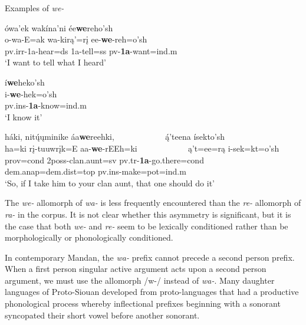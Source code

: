 \begin{exe}

\item\label{WEexamples} Examples of \textit{we-}

	\begin{xlist}
	
	\item \glll ówa'ek wakína'ni ée\textbf{we}reho'sh\\
	o-wa-E=ak wa-kirą'=rį ee-\textbf{we}-reh=o'sh\\
	pv.irr-1a-\textnormal{hear}=ds 1a-\textnormal{tell}=ss pv-\textbf{1a}-\textnormal{want}=ind.m\\
	\glt `I want to tell what I heard' \citep[47]{hollow1973a}
	
	\item \glll í\textbf{we}heko'sh\\
	i-\textbf{we}-hek=o'sh\\
	pv.ins-\textbf{1a}-\textnormal{know}=ind.m\\
	\glt `I know it' \citep[5]{kennard1936}
	
	\item \glll háki, nitų́ųminike áa\textbf{we}reehki, ~ ~ ~ ~ ~ ~ ~ ą́'teena ísekto'sh\\
	ha=ki rį-tuuwrįk=E aa-\textbf{we}-rEEh=ki ~ ~ ~ ~ ~ ~ ~ ą't=ee=rą i-sek=kt=o'sh\\
	prov=cond 2poss-\textnormal{clan.aunt}=sv pv.tr-\textbf{1a}-\textnormal{go.there}=cond ~ ~ ~ ~ ~ ~ ~ dem.anap=dem.dist=top pv.ins-\textnormal{make}=pot=ind.m\\
	\glt `So, if I take him to your clan aunt, that one should do it' \citep[57]{hollow1973a}
	
	\end{xlist}

\end{exe}

The \textit{we-} allomorph of \textit{wa-} is less frequently encountered than the \textit{re-} allomorph of \textit{ra-} in the corpus. It is not clear whether this asymmetry is significant, but it is the case that both \textit{we-} and \textit{re-} seem to be lexically conditioned rather than be morphologically or phonologically conditioned.

\label{allomorphw}

In contemporary Mandan, the \textit{wa-} prefix cannot precede a second person prefix. When a first person singular active argument acts upon a second person argument, we must use the allomorph /w-/ instead of \textit{wa-}. Many daughter languages of Proto-Siouan developed from proto-languages that had a productive phonological process whereby inflectional prefixes beginning with a sonorant syncopated their short vowel before another sonorant. 

